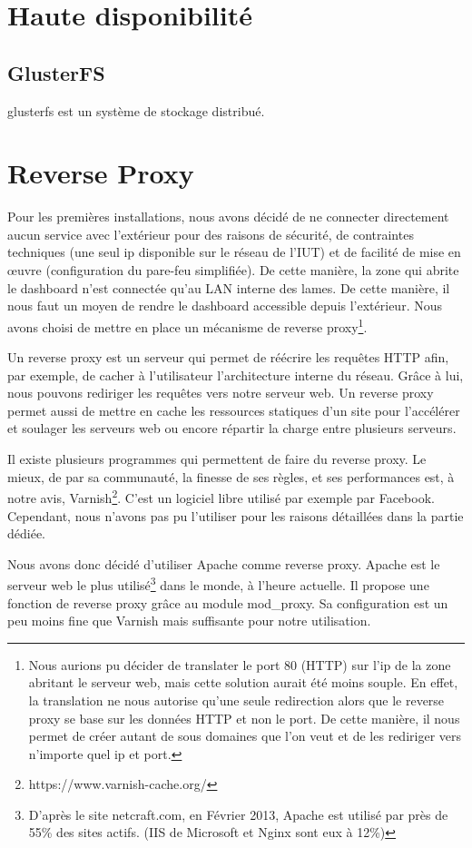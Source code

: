 \documentclass[a4paper,oneside]{report}
\begin{document}
\section{Haute disponibilité}
\subsection{GlusterFS} \label{sec:glusterfs}
\gls{glusterfs} est un système de stockage distribué.

\section{Reverse Proxy}
Pour les premières installations, nous avons décidé de ne connecter directement aucun service avec l'extérieur pour des raisons de sécurité, de contraintes techniques (une seul ip disponible sur le réseau de l'IUT) et de facilité de mise en œuvre (configuration du pare-feu simplifiée).
De cette manière, la zone qui abrite le dashboard n'est connectée qu'au LAN interne des lames.
De cette manière, il nous faut un moyen de rendre le dashboard accessible depuis l'extérieur. 
Nous avons choisi de mettre en place un mécanisme de reverse proxy\footnote{Nous aurions pu décider de translater le port 80 (HTTP) sur l'ip de la zone abritant le serveur web, mais cette solution aurait été moins souple.
En effet, la translation ne nous autorise qu'une seule redirection alors que le reverse proxy se base sur les données HTTP et non le port. De cette manière, il nous permet de créer autant de sous domaines que l'on veut et de les rediriger vers n'importe quel ip et port.}.

Un reverse proxy est un serveur qui permet de réécrire les requêtes HTTP afin, par exemple, de cacher à l'utilisateur l'architecture interne du réseau.
Grâce à lui, nous pouvons rediriger les requêtes vers notre serveur web.
Un reverse proxy permet aussi de mettre en cache les ressources statiques d'un site pour l'accélérer et soulager les serveurs web ou encore répartir la charge entre plusieurs serveurs.

Il existe plusieurs programmes qui permettent de faire du reverse proxy.
Le mieux, de par sa communauté, la finesse de ses règles, et ses performances est, à notre avis, Varnish\footnote{https://www.varnish-cache.org/}.
C'est un logiciel libre utilisé par exemple par Facebook. Cependant, nous n'avons pas pu l'utiliser pour les raisons détaillées dans la partie dédiée.

Nous avons donc décidé d'utiliser Apache comme reverse proxy. Apache est le serveur web le plus utilisé\footnote{D'après le site netcraft.com, en Février 2013, Apache est utilisé par près de 55\% des sites actifs. (IIS de Microsoft et Nginx sont eux à 12\%)} dans le monde, à l'heure actuelle.
Il propose une fonction de reverse proxy grâce au module mod\_proxy. Sa configuration est un peu moins fine que Varnish mais suffisante pour notre utilisation.
\end{document}
